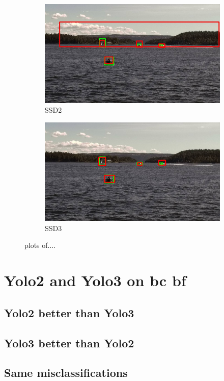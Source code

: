 \begin{figure}
\begin{subfigure}{.5\textwidth}
  \centering
  \includegraphics[width=0.9\linewidth]{results/case_buildings/bigbox_bcbf/SSD2/selected_08_14_frame1150.jpg}
  \caption{SSD2}
  \label{fig:sfig1}
\end{subfigure}%
\begin{subfigure}{.5\textwidth}
  \centering
  \includegraphics[width=.9\linewidth]{results/case_buildings/bigbox_bcbf/SSD3/selected_08_14_frame1150.jpg}
  \caption{SSD3}
  \label{fig:sfig2}
\end{subfigure}

\caption{plots of....}
\label{fig:fig}
\end{figure}

\section{Yolo2 and Yolo3 on bc bf}

\subsection{Yolo2 better than Yolo3}
\subsection{Yolo3 better than Yolo2}
\subsection{Same misclassifications}
